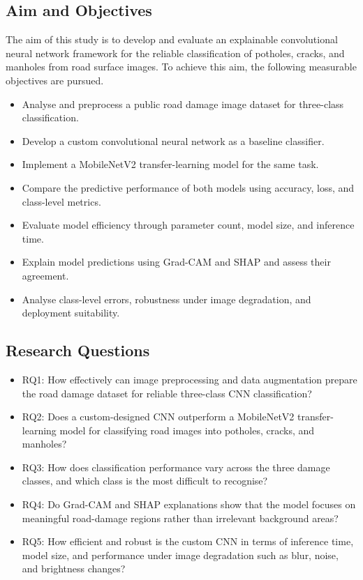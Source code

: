 \documentclass[preprint,12pt]{elsarticle}
\begin{document}
\subsection{Aim and Objectives}

The aim of this study is to develop and evaluate an explainable convolutional neural network framework for the reliable classification of potholes, cracks, and manholes from road surface images.
To achieve this aim, the following measurable objectives are pursued.
\begin{itemize}
    \item Analyse and preprocess a public road damage image dataset for three-class classification.
    \item Develop a custom convolutional neural network as a baseline classifier.
    \item Implement a MobileNetV2 transfer-learning model for the same task.
    \item Compare the predictive performance of both models using accuracy, loss, and class-level metrics.
    \item Evaluate model efficiency through parameter count, model size, and inference time.
    \item Explain model predictions using Grad-CAM and SHAP and assess their agreement.
    \item Analyse class-level errors, robustness under image degradation, and deployment suitability.
\end{itemize}

\subsection{Research Questions}

\begin{itemize}
    \item RQ1: How effectively can image preprocessing and data augmentation prepare the road damage dataset for reliable three-class CNN classification?
    \item RQ2: Does a custom-designed CNN outperform a MobileNetV2 transfer-learning model for classifying road images into potholes, cracks, and manholes?
    \item RQ3: How does classification performance vary across the three damage classes, and which class is the most difficult to recognise?
    \item RQ4: Do Grad-CAM and SHAP explanations show that the model focuses on meaningful road-damage regions rather than irrelevant background areas?
    \item RQ5: How efficient and robust is the custom CNN in terms of inference time, model size, and performance under image degradation such as blur, noise, and brightness changes?
\end{itemize}
\end{document}
